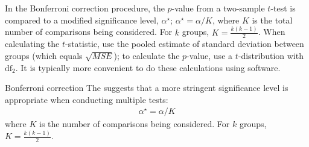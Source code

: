 In the Bonferroni correction procedure, the $p$-value from a two-sample $t$-test is compared to a modified significance level, $\alpha^\star$; $\alpha^\star = \alpha/K$, where $K$ is the total number of comparisons being considered. For $k$ groups, $K=\frac{k(k-1)}{2}$. When calculating the $t$-statistic, use the pooled estimate of standard deviation between groups (which equals $\sqrt{MSE}$); to calculate the $p$-value, use a $t$-distribution with $\textrm{df}_2$. It is typically more convenient to do these calculations using software. 

\begin{onebox}{Bonferroni correction}
The  suggests that a more stringent significance level is appropriate when conducting multiple tests:
\begin{align*}
\alpha^\star = \alpha / K
\end{align*}
where $K$ is the number of comparisons being considered. For $k$ groups, $K=\frac{k(k-1)}{2}$.
\end{onebox}

